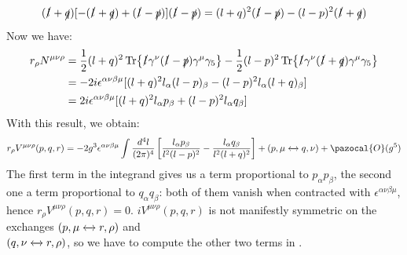 \documentclass[../main.tex]{subfiles}
\begin{document}
\[
(\slashed{l}+\slashed{q})[-(\slashed{l}+\slashed{q})+(\slashed{l}-\slashed{p})](\slashed{l}-\slashed{p})=(l+q)^2(\slashed{l}-\slashed{p})-(l-p)^2(\slashed{l}+\slashed{q})
\]
Now we have:
\begin{align*}
r_\rho N^{\mu\nu\rho}&=\frac{1}{2}(l+q)^2\Tr{\slashed{l}\gamma^\nu(\slashed{l}-\slashed{p})\gamma^\mu\gamma_5}-\frac{1}{2}(l-p)^2\Tr{\slashed{l}\gamma^\nu(\slashed{l}+\slashed{q})\gamma^\mu\gamma_5}\\
&=-2i\epsilon^{\alpha\nu\beta\mu}[(l+q)^2l_\alpha(l-p)_\beta-(l-p)^2l_\alpha(l+q)_\beta]\\
&=2i\epsilon^{\alpha\nu\beta\mu}[(l+q)^2l_\alpha p_\beta+(l-p)^2l_\alpha q_\beta]
\end{align*}
With this result, we obtain:
\[
r_\rho V^{\mu\nu\rho}(p,q,r)=-2g^3\epsilon^{\alpha\nu\beta\mu}\int\frac{d^4l}{(2\pi)^4}\left[\frac{l_\alpha p_\beta}{l^2(l-p)^2}-\frac{l_\alpha q_\beta}{l^2(l+q)^2}\right]+(p,\mu\xleftrightarrow[]{}q,\nu)+\pazocal{O}(g^5)
\]
The first term in the integrand gives us a term proportional to $p_\alpha p_\beta$, the second one a term proportional to $q_\alpha q_\beta$: both of them vanish when contracted with $\epsilon^{\alpha\nu\beta\mu}$, hence $r_\rho V^{\mu\nu\rho}(p,q,r)=0$. $iV^{\mu\nu\rho}(p,q,r)$ is not manifestly symmetric on the exchanges $(p,\mu\xleftrightarrow[]{}r,\rho)$ and\\ $(q,\nu\xleftrightarrow[]{}r,\rho)$, so we have to compute the other two terms in .
\end{document}
